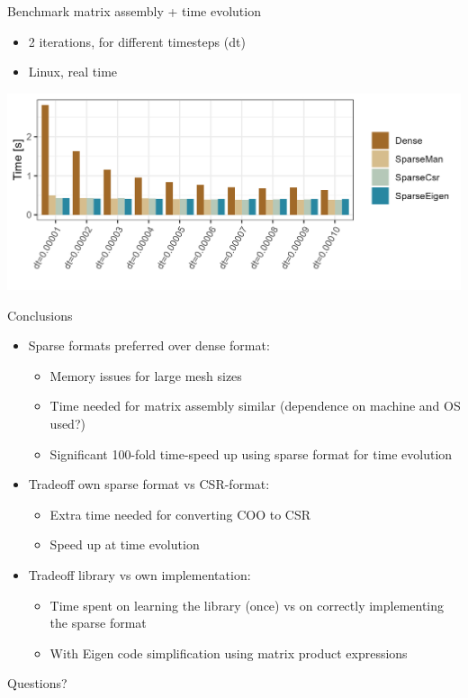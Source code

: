 \documentclass[aspectratio=169,xcolor=dvipsnames]{beamer}
\begin{document}
\begin{frame}{Benchmark matrix assembly + time evolution}
   
    \begin{itemize}
        \item 2 iterations, for different timesteps (dt)
        \item Linux, real time
    \end{itemize}
    
    \begin{center}
   \includegraphics[width=1\linewidth]{ode_bench_result2.png}
   \end{center}
   
\end{frame}



\begin{frame}{Conclusions}
   \begin{itemize}
      \item Sparse formats preferred over dense format:
   	 \begin{itemize}
   	  \item Memory issues for large mesh sizes
	  \item Time needed for matrix assembly similar (dependence on machine and OS used?)
	  \item Significant 100-fold time-speed up using sparse format for time evolution
     \end{itemize}
   	 \item Tradeoff own sparse format vs CSR-format:
   	 \begin{itemize}
	  \item Extra time needed for converting COO to CSR 
	  \item Speed up at time evolution
	  
	  \end{itemize}
	  \item Tradeoff library vs own implementation:
	  \begin{itemize}
	  \item Time spent on learning the library (once) vs on correctly implementing the sparse format
	  \item With Eigen code simplification using matrix product expressions
	  \end{itemize}
   \end{itemize}
\end{frame}


\begin{frame}
    \Huge{\centerline{Questions?}}
\end{frame}
\end{document}
